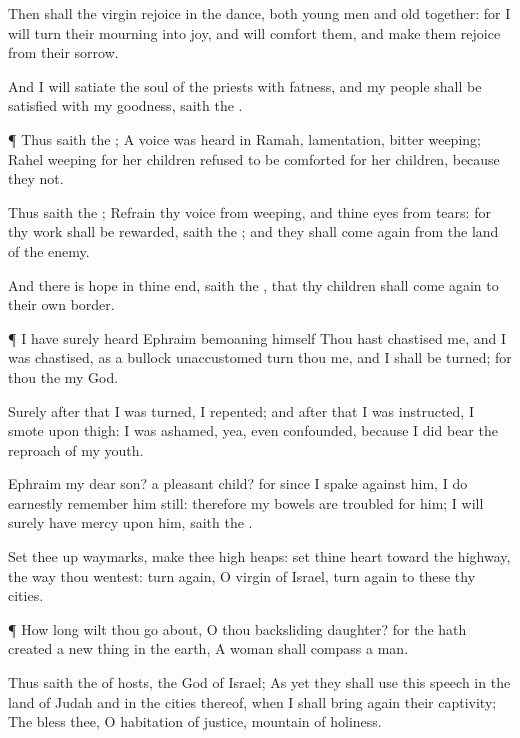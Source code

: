{Then shall the
virgin
rejoice in the
dance, both young
men and
old
together: for I will
turn their
mourning into
joy, and will
comfort them, and make them
rejoice from their
sorrow.

And I will
satiate the
soul of the
priests with
fatness, and my
people shall be
satisfied with my
goodness,
saith the
{}.


\par }{\PP {}¶ Thus
saith the
{}; A
voice was
heard in
Ramah,
lamentation,
{}
bitter
weeping;
Rahel
weeping for her
children
refused to be
comforted for her
children, because they
{} not.

Thus
saith the
{};
Refrain thy
voice from
weeping, and thine
eyes from
tears: for thy
work shall
be
rewarded,
saith the
{}; and they shall come
again from the
land of the
enemy.

And there
is
hope in thine
end,
saith the
{}, that thy
children shall come
again to their own
border.


\par }{\PP {}¶ I have
surely
heard
Ephraim
bemoaning himself
{} Thou hast
chastised me, and I was
chastised, as a
bullock
unaccustomed
{}
turn thou me, and I shall be
turned; for thou
{} the
{} my
God.

Surely
after that I was
turned, I
repented; and
after that I was
instructed, I
smote upon
{}
thigh: I was
ashamed, yea, even
confounded, because I did
bear the
reproach of my
youth.

Ephraim my
dear
son?
{} a
pleasant
child? for
since I
spake against him, I do
earnestly
remember him still: therefore my
bowels are
troubled for him; I will
surely have
mercy upon him,
saith the
{}.

Set thee
up
waymarks,
make thee high
heaps:
set thine
heart toward the
highway,
{} the
way
{} thou
wentest: turn
again, O
virgin of
Israel, turn
again to these thy
cities.


\par }{\PP {}¶ How long wilt thou go
about, O thou
backsliding
daughter? for the
{} hath
created a new
thing in the
earth, A
woman shall
compass a
man.

Thus
saith the
{} of
hosts, the
God of
Israel; As yet they shall
use this
speech in the
land of
Judah and in the
cities thereof, when I shall bring
again their
captivity; The
{}
bless thee, O
habitation of
justice,
{}
mountain of
holiness.

}
